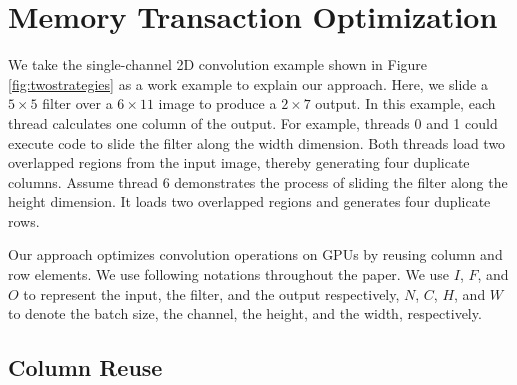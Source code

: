 \section{Memory Transaction Optimization}
\label{sec:strategies}

 We take the single-channel 2D convolution example shown in Figure \ref{fig:twostrategies} as a work example to
explain our approach. Here, we slide a $5 \times 5$ filter over a $6 \times 11$ image to produce a $2 \times 7$ output. In this example,
each thread calculates one column of the output. For example, threads 0 and 1 could execute code to slide the filter along the width
dimension. Both threads load two overlapped regions from the input image, thereby generating four duplicate columns. Assume thread 6
demonstrates the process of sliding the filter along the height dimension. It loads two overlapped regions and generates four duplicate
rows.

 Our approach optimizes convolution operations on GPUs by reusing column and row elements. We use following notations
throughout the paper. We use $I$, $F$, and $O$ to represent the input, the filter, and the output respectively, $N$, $C$, $H$, and $W$ to
denote the batch size, the channel, the height, and the width, respectively.


\subsection{Column Reuse}
\label{sec:creuse}

